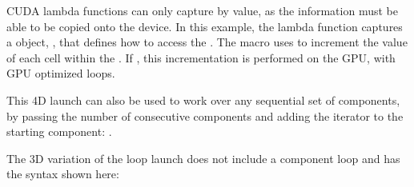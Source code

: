 \documentclass[letterpaper,10pt,english]{sphinxmanual}
\begin{document}
\sphinxAtStartPar
CUDA lambda functions can only capture by value, as the information
must be able to be copied onto the device.  In this example, the
lambda function captures a  object, , that defines
how to access the .  The macro uses  to
increment the value of each cell within the .  If
, this incrementation is performed on the GPU, with
GPU optimized loops.

\sphinxAtStartPar
This 4D launch can also be used to work over any sequential set of components, by passing the
number of consecutive components and adding the iterator to the starting component:
.

\sphinxAtStartPar
The 3D variation of the loop launch does not include a component loop and has the syntax
shown here:

\begin{sphinxVerbatim}[commandchars=\\\{\}]
    
        
        
    \PYG{p}{[}\PYG{p}{]}       
          

\end{sphinxVerbatim}
\end{document}
